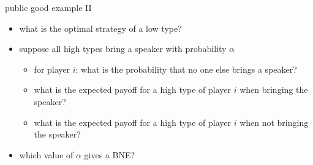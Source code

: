 \documentclass[bigger]{beamer}
\begin{document}
\begin{frame}[label={sec:orgfb6a1f7}]{public good example II}
\begin{itemize}
\item what is the optimal strategy of a low type?
\item suppose all high types bring a speaker with probability \(\alpha\)
\begin{itemize}
\item for player \(i\): what is the probability that no one else brings a speaker?
\end{itemize}

\begin{itemize}
\item what is the expected payoff for a high type of player \(i\) when bringing the speaker?
\end{itemize}

\begin{itemize}
\item what is the expected payoff for a high type of player \(i\) when not bringing the speaker?
\end{itemize}
\item which value of \(\alpha\) gives a BNE?

\vspace*{0.5cm}
\end{itemize}
\begin{figure}   
    \end{figure}
\end{frame}
\end{document}
